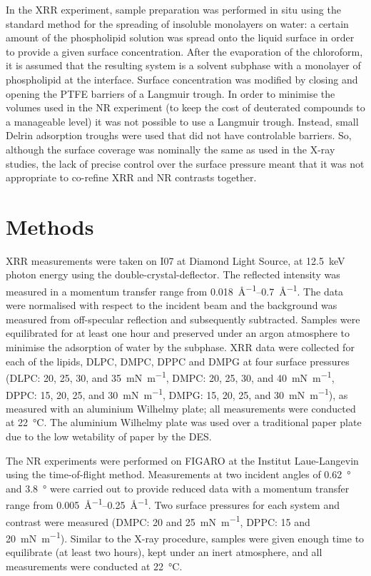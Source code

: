 \documentclass[11pt,a4paper]{paper}
\begin{document}
In the XRR experiment, sample preparation was performed in situ using the standard method for the spreading of insoluble monolayers on water: a certain amount of the phospholipid solution was spread onto the liquid surface in order to provide a given surface concentration. After the evaporation of the chloroform, it is assumed that the resulting system is a solvent subphase with a monolayer of phospholipid at the interface. Surface concentration was modified by closing and opening the PTFE barriers of a Langmuir trough. In order to minimise the volumes used in the NR experiment (to keep the cost of deuterated compounds to a manageable level) it was not possible to use a Langmuir trough. Instead, small Delrin adsorption troughs were used that did not have controlable barriers. So, although the surface coverage was nominally the same as used in the X-ray studies, the lack of precise control over the surface pressure meant that it was not appropriate to co-refine XRR and NR contrasts together.

\section{Methods}
XRR measurements were taken on I07 at Diamond Light Source, at \SI{12.5}{\kilo\eV} photon energy using the double-crystal-deflector.\cite{Arnold2012} The reflected intensity was measured in a momentum transfer range from \SIrange{0.018}{0.7}{\AA^{-1}}. The data were normalised with respect to the incident beam and the background was measured from off-specular reflection and subsequently subtracted. Samples were equilibrated for at least one hour and preserved under an argon atmosphere to minimise the adsorption of water by the subphase. XRR data were collected for each of the lipids, DLPC, DMPC, DPPC and DMPG at four surface pressures (DLPC: 20, 25, 30, and \SI{35}{\milli\newton\meter^{-1}}, DMPC: 20, 25, 30, and \SI{40}{\milli\newton\meter^{-1}}, DPPC: 15, 20, 25, and \SI{30}{\milli\newton\meter^{-1}}, DMPG: 15, 20, 25, and \SI{30}{\milli\newton\meter^{-1}}), as measured with an aluminium Wilhelmy plate; all measurements were conducted at \SI{22}{\celsius}. The aluminium Wilhelmy plate was used over a traditional paper plate due to the low wetability of paper by the DES.

The NR experiments were performed on FIGARO at the Institut Laue-Langevin using the time-of-flight method.\cite{Campbell2011} Measurements at two incident angles of \SI{0.62}{\degree} and \SI{3.8}{\degree} were carried out to provide reduced data with a momentum transfer range from \SIrange{0.005}{0.25}{\AA^{-1}}. Two surface pressures for each system and contrast were measured (DMPC: 20 and \SI{25}{\milli\newton\meter^{-1}}, DPPC: 15 and \SI{20}{\milli\newton\meter^{-1}}). Similar to the X-ray procedure, samples were given enough time to equilibrate (at least two hours), kept under an inert atmosphere, and all measurements were conducted at \SI{22}{\celsius}.
\end{document}

